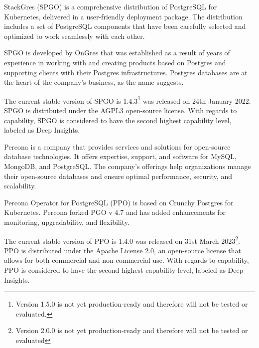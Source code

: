 StackGres (SPGO) is a comprehensive distribution of PostgreSQL for Kubernetes, delivered in a user-friendly deployment package. The distribution includes a set of PostgreSQL components that have been carefully selected and optimized to work seamlessly with each other. \cite{SPGOgitlab}

SPGO is developed by OnGres that was established as a result of years of experience in working with and creating products based on Postgres and supporting clients with their Postgres infrastructures. Postgres databases are at the heart of the company's business, as the name suggests. \cite{OnGres}


The current stable version of SPGO is 1.4.3\footnote{Version 1.5.0 is not yet production-ready and therefore will not be tested or evaluated.} was released on 24th January 2022. \cite{SPGOgitlabChangelog} SPGO is distributed under the AGPL3 open-source license. \cite{SPGODocuLicence}
With regards to capability, SPGO is considered to have the second highest capability level, labeled as Deep Insights. \cite{OperatorHubStackgres}

Percona is a company that provides services and solutions for open-source database technologies. It offers expertise, support, and software for MySQL, MongoDB, and PostgreSQL. The company's offerings help organizations manage their open-source databases and ensure optimal performance, security, and scalability. \cite{Percona}

Percona Operator for PostgreSQL (PPO) is based on Crunchy Postgres for Kubernetes. Percona forked PGO v 4.7 and has added enhancements for monitoring, upgradability, and flexibility. \cite{PerconaBlogProsAndCons}

The current stable version of PPO is 1.4.0 was released on 31st March 2023\footnote{Version 2.0.0 is not yet production-ready and therefore will not be tested or evaluated}. \cite{PerconaDocuV2} PPO is distributed under the Apache License 2.0, an open-source license that allows for both commercial and non-commercial use. With regards to capability, PPO is considered to have the second highest capability level, labeled as Deep Insights. \cite{OperatorHubPercona}


